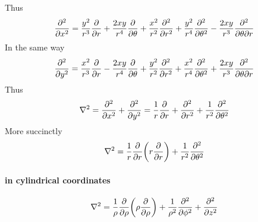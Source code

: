 \documentclass[UTF8]{ctexart} %
\numberwithin{equation}{section}
\begin{document}
Thus
\begin{equation}\label{key}
\pdv[2]{x}=\dfrac{y^2}{r^3}\pdv{r}+\dfrac{2xy}{r^4}\pdv{\theta}+\dfrac{x^2}{r^2}\pdv[2]{r}+\dfrac{y^2}{r^4}\pdv[2]{\theta}-\dfrac{2xy}{r^3}\pdv[2]{}{\theta}{r}
\end{equation}
In the same way
\begin{equation}\label{key}
\pdv[2]{y}=\dfrac{x^2}{r^3}\pdv{r}-\dfrac{2xy}{r^4}\pdv{\theta}+\dfrac{y^2}{r^2}\pdv[2]{r}+\dfrac{x^2}{r^4}\pdv[2]{\theta}+\dfrac{2xy}{r^3}\pdv[2]{}{\theta}{r}
\end{equation}
Thus
\begin{equation}\label{key}
\nabla^2=\pdv[2]{x}+\pdv[2]{y}=\dfrac{1}{r}\pdv{r}+\pdv[2]{r}+\dfrac{1}{r^2}\pdv[2]{\theta}
\end{equation}
More succinctly
\begin{equation}\label{key}
\nabla^2=\dfrac{1}{r}\pdv{r}\qty(r\pdv{r})+\dfrac{1}{r^2}\pdv[2]{\theta}
\end{equation}
\paragraph{in cylindrical coordinates}
\begin{equation}\label{key}
\nabla^2=\dfrac{1}{\rho}\pdv{\rho}\qty(\rho\pdv{\rho})+\dfrac{1}{\rho^2}\pdv[2]{\phi}+\pdv[2]{z}
\end{equation}
\end{document}
